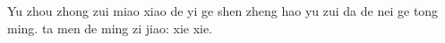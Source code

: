 \documentclass[
11pt, %
oneside, %
english, %
doublespacing,
liststotoc, %
parskip, %
consistentlayout, %
]{MastersDoctoralThesis} %
\begin{document}

\begin{acknowledgements}
  \addchaptertocentry{\acknowledgementname} %
  Yu zhou zhong zui miao xiao de yi ge shen zheng hao yu zui da de nei
  ge tong ming. ta men de ming zi jiao: xie xie.
\end{acknowledgements}

\clearpage
\tableofcontents
\clearpage
{}
{}
\listoffigures %
\clearpage
{}
{}
\listoftables %

\end{document}
